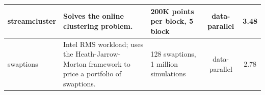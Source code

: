 \begin{table}[!t]
\begin{tabular}{|p{1.2cm}|p{9.7cm}|p{3.7cm}|c|c|}
	streamcluster & Solves the online clustering problem. & 200K points per block, 5 block & 
data-parallel & 3.48 \\ \hline
	swaptions & Intel RMS workload; uses the Heath-Jarrow-Morton framework to price a portfolio of swaptions. & 128 swaptions, 1 million  simulations & data-parallel & 2.78 \\ \hline
	\end{tabular}
	\label{tab:parsec}
	\vspace{-0.3cm}
\end{table}


% 





